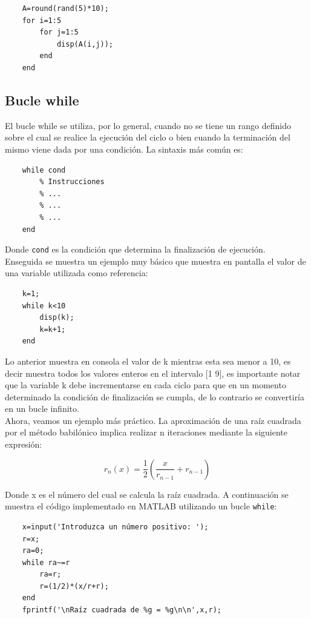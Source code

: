 \begin{verbatim}
	A=round(rand(5)*10);
	for i=1:5
	    for j=1:5
	        disp(A(i,j));
	    end
	end
\end{verbatim}


\subsection{Bucle while}

El bucle while se utiliza, por lo general, cuando no se tiene un rango definido 
sobre el cual se realice la ejecución del ciclo o bien cuando la terminación del 
mismo viene dada por una condición. La sintaxis más común es:

\begin{verbatim}
	while cond
	    % Instrucciones
	    % ...
	    % ...
	    % ...
	end
\end{verbatim}

Donde \texttt{cond} es la condición que determina la finalización de ejecución.\\

Enseguida se muestra un ejemplo muy básico que muestra en pantalla el valor 
de una variable utilizada como referencia:

\begin{verbatim}
	k=1;
	while k<10
	    disp(k);
	    k=k+1;
	end
\end{verbatim}

Lo anterior muestra en consola el valor de k mientras esta sea menor a 10, es decir 
muestra todos los valores enteros en el intervalo [1  9], es importante notar que 
la variable k debe incrementarse en cada ciclo para que en un momento determinado 
la condición de finalización se cumpla, de lo contrario se convertiría en un bucle infinito.\\

Ahora, veamos un ejemplo más práctico. La aproximación de una raíz cuadrada por 
el método babilónico implica realizar n iteraciones mediante la siguiente expresión:

$$r_n(x) = \frac{1}{2}(\frac{x}{r_{n-1}}+r_{n-1})$$

Donde x es el número del cual se calcula la raíz cuadrada. A continuación se muestra 
el código implementado en MATLAB utilizando un bucle \texttt{while}:

\begin{verbatim}
	x=input('Introduzca un número positivo: ');
	r=x;
	ra=0;
	while ra~=r
	    ra=r;
	    r=(1/2)*(x/r+r);
	end
	fprintf('\nRaíz cuadrada de %g = %g\n\n',x,r);
\end{verbatim}

